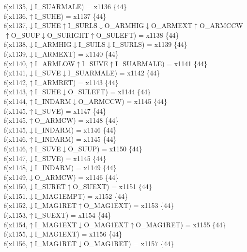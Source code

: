 f(x1135,$\downarrow$I\_SUARMALE) = x1136 \{44\} \\  
f(x1136,$\uparrow$I\_SUHE) = x1137 \{44\} \\  
f(x1137,$\downarrow$I\_SUHE$\uparrow$I\_SURLS$\downarrow$O\_ARMHIG$\downarrow$O\_ARMEXT$\uparrow$O\_ARMCCW$\uparrow$O\_SUUP$\downarrow$O\_SURIGHT$\uparrow$O\_SULEFT) = x1138 \{44\} \\  
f(x1138,$\downarrow$I\_ARMHIG$\downarrow$I\_SUILS$\downarrow$I\_SURLS) = x1139 \{44\} \\  
f(x1139,$\downarrow$I\_ARMEXT) = x1140 \{44\} \\  
f(x1140,$\uparrow$I\_ARMLOW$\uparrow$I\_SUVE$\uparrow$I\_SUARMALE) = x1141 \{44\} \\  
f(x1141,$\downarrow$I\_SUVE$\downarrow$I\_SUARMALE) = x1142 \{44\} \\  
f(x1142,$\uparrow$I\_ARMRET) = x1143 \{44\} \\  
f(x1143,$\uparrow$I\_SUHE$\downarrow$O\_SULEFT) = x1144 \{44\} \\  
f(x1144,$\uparrow$I\_INDARM$\downarrow$O\_ARMCCW) = x1145 \{44\} \\  
f(x1145,$\uparrow$I\_SUVE) = x1147 \{44\} \\  
f(x1145,$\uparrow$O\_ARMCW) = x1148 \{44\} \\  
f(x1145,$\downarrow$I\_INDARM) = x1146 \{44\} \\  
f(x1146,$\uparrow$I\_INDARM) = x1145 \{44\} \\  
f(x1146,$\uparrow$I\_SUVE$\downarrow$O\_SUUP) = x1150 \{44\} \\  
f(x1147,$\downarrow$I\_SUVE) = x1145 \{44\} \\  
f(x1148,$\downarrow$I\_INDARM) = x1149 \{44\} \\  
f(x1149,$\downarrow$O\_ARMCW) = x1146 \{44\} \\  
f(x1150,$\downarrow$I\_SURET$\uparrow$O\_SUEXT) = x1151 \{44\} \\  
f(x1151,$\downarrow$I\_MAG1EMPT) = x1152 \{44\} \\  
f(x1152,$\downarrow$I\_MAG1RET$\uparrow$O\_MAG1EXT) = x1153 \{44\} \\  
f(x1153,$\uparrow$I\_SUEXT) = x1154 \{44\} \\  
f(x1154,$\uparrow$I\_MAG1EXT$\downarrow$O\_MAG1EXT$\uparrow$O\_MAG1RET) = x1155 \{44\} \\  
f(x1155,$\downarrow$I\_MAG1EXT) = x1156 \{44\} \\  
f(x1156,$\uparrow$I\_MAG1RET$\downarrow$O\_MAG1RET) = x1157 \{44\} \\  
